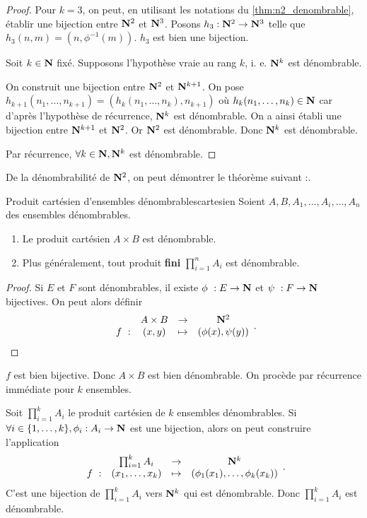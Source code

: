 \documentclass[a4paper,french,final]{memoir}
\begin{document}
\begin{proof}

Pour $k = 3$, on peut, en utilisant les notations du \cref{thm:n2_denombrable}, établir une bijection entre $\mathbf{N}^2$ et $\mathbf{N}^3$. Posons $h_3 : \mathbf{N}^2 \to \mathbf{N}^3$ telle que $h_3(n,m) = (n,\phi^{-1}(m))$. $h_3$ est bien une bijection. 

Soit $k \in \mathbf{N}$ fixé. Supposons l'hypothèse vraie au rang $k$, i. e. $\mathbf{N}^k$ est dénombrable.

On construit une bijection entre $\mathbf{N}^2$ et $\mathbf{N}^{k+1}$. On pose $h_{k+1}(n_1, \dots, n_{k+1}) = (h_k(n_1, \dots, n_k),n_{k+1})$ où $h_k(n_1, \dots, n_k) \in \mathbf{N}$ car d'après l'hypothèse de récurrence, $\mathbf{N}^k$ est dénombrable. On a ainsi établi une bijection entre $\mathbf{N}^{k+1}$ et $\mathbf{N}^2$. Or $\mathbf{N}^2$ est dénombrable. Donc $\mathbf{N}^k$ est dénombrable. 

Par récurrence, $\forall k \in \mathbf{N}, \mathbf{N}^k$ est dénombrable. 

\end{proof}
De la dénombrabilité de $\mathbf{N}^2$, on peut démontrer le théorème suivant :. 
\begin{theoremb}{Produit cartésien d'ensembles dénombrables}{cartesien}
	Soient $A, B, A_1, \dots, A_i, \dots, A_n$ des ensembles dénombrables. 
	\begin{enumerate}
		\item Le produit cartésien $A \times B$ est dénombrable. 
		\item Plus généralement, tout produit \textbf{fini} $\prod_{i=1}^{n} A_i $ est dénombrable.
	\end{enumerate}
\end{theoremb}
\begin{proof}
	Si $E$ et $F$ sont dénombrables, il existe $\phi~: E \to \NN$ et $\psi~: F \to \mathbf{N}$ bijectives. On peut alors définir \[ \begin{array}{cccc}
	\ & A \times B & \to & \NN^2 \\
	f~: & (x,y) & \mapsto & (\phi(x), \psi(y))
	\end{array}.\]
	
\end{proof}

$f $ est bien bijective. Donc $A \times B$ est bien dénombrable. On procède par récurrence immédiate pour $k$ ensembles. 

Soit $\prod_{i =1}^k A_i$ le produit cartésien de $k$ ensembles dénombrables. Si $\forall i \in \{1,\dots,k\}, \phi_i : A_i \to \NN$ est une bijection, alors on peut construire l'application \[ \begin{array}{cccc}
	\ & \prod_{i=1}^k A_i & \to & \NN^k\\
	f~: & (x_1,\dots,x_k) & \mapsto & (\phi_1(x_1),\dots, \phi_k(x_k))
	\end{array}.\] 
C'est une bijection de $\prod_{i=1}^k A_i $ vers $\mathbf{N}^k$ qui est dénombrable. Donc $\prod_{i=1}^kA_i$ est dénombrable.
\end{document}
